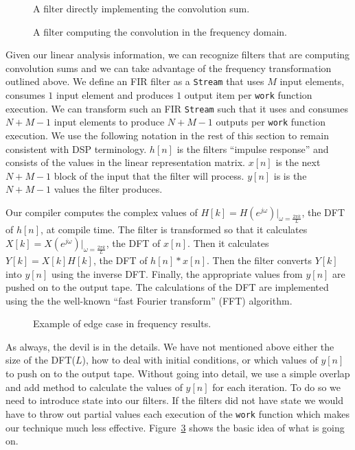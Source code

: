 \begin{figure}
\center
\epsfxsize=2.0in
\caption{A filter directly implementing the convolution sum.}
\label{fig:frequency-conversion-convolution}
\end{figure}

\begin{figure}
\center
\epsfxsize=2.0in
\caption{A filter computing the convolution in the frequency domain.}
\label{fig:frequency-conversion-frequency}
\end{figure}

Given our linear analysis information, we can recognize filters that are
computing convolution sums and we can take advantage of the frequency transformation 
outlined above. We define an FIR filter as a {\tt Stream} that uses $M$ input elements,
consumes $1$ input element and produces $1$ output item per {\tt work} function execution.
We can transform such an FIR {\tt Stream} such that it uses and consumes $N+M-1$ input
elements to produce $N+M-1$ outputs per {\tt work} function execution. We use the 
following notation in the rest of this section to remain consistent with DSP terminology.
$h[n]$ is the filters ``impulse response'' and consists of the values in the linear 
representation matrix. $x[n]$ is the next $N+M-1$ block of the input that the filter
will process. $y[n]$ is is the $N+M-1$ values the filter produces.

Our compiler computes the complex values of $H[k]=H(e^{j\omega})|_{\omega=\frac{2{\pi}k}{L}}$, 
the DFT of $h[n]$, at compile time. The filter is transformed 
so that it  calculates $X[k]=X(e^{j\omega})|_{\omega=\frac{2{\pi}k}{L}}$, the DFT 
of $x[n]$. Then it calculates $Y[k]=X[k]H[k]$, the DFT of $h[n]*x[n]$.
Then the filter converts $Y[k]$ into $y[n]$ using the inverse DFT. Finally, 
the appropriate values from $y[n]$ are pushed on to the output tape. The
calculations of the DFT are implemented using the the well-known 
``fast Fourier transform'' (FFT) algorithm.

\begin{figure}
\center
\epsfxsize=3.0in
\caption{Example of edge case in frequency results.}
\label{fig:frequency-example}
\end{figure}

As always, the devil is in the details. We have not mentioned above either 
the size of the DFT($L$), how to deal with initial conditions, or which 
values of $y[n]$ to push on to the output tape. 
Without going into detail, we use a simple overlap and add\cite{oppenheim-discrete} 
method to calculate the values of $y[n]$ for each iteration. To do so 
we need to introduce state into our filters. If the filters did not have state
we would have to throw out partial values each execution of the {\tt work} function
which makes our technique much less effective. Figure~\ref{fig:frequency-example} shows
the basic idea of what is going on.


